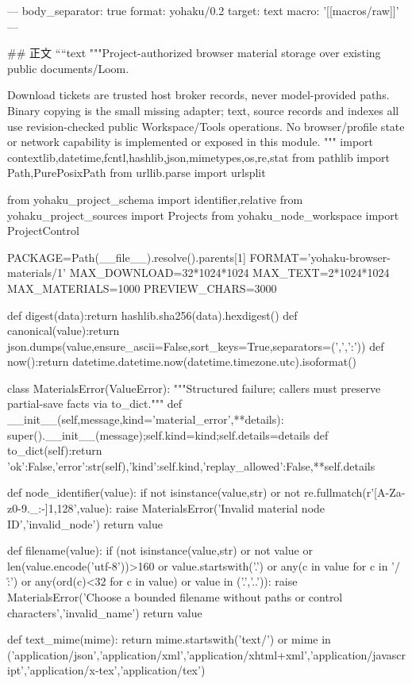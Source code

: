 ---
body_separator: true
format: yohaku/0.2
target: text
macro: '[[macros/raw]]'
---

## 正文
````text
"""Project-authorized browser material storage over existing public documents/Loom.

Download tickets are trusted host broker records, never model-provided paths.
Binary copying is the small missing adapter; text, source records and indexes all
use revision-checked public Workspace/Tools operations. No browser/profile state
or network capability is implemented or exposed in this module.
"""
import contextlib,datetime,fcntl,hashlib,json,mimetypes,os,re,stat
from pathlib import Path,PurePosixPath
from urllib.parse import urlsplit

from yohaku_project_schema import identifier,relative
from yohaku_project_sources import Projects
from yohaku_node_workspace import ProjectControl

PACKAGE=Path(__file__).resolve().parents[1]
FORMAT='yohaku-browser-materials/1'
MAX_DOWNLOAD=32*1024*1024
MAX_TEXT=2*1024*1024
MAX_MATERIALS=1000
PREVIEW_CHARS=3000

def digest(data):return hashlib.sha256(data).hexdigest()
def canonical(value):return json.dumps(value,ensure_ascii=False,sort_keys=True,separators=(',',':'))
def now():return datetime.datetime.now(datetime.timezone.utc).isoformat()

class MaterialsError(ValueError):
    """Structured failure; callers must preserve partial-save facts via to_dict."""
    def __init__(self,message,kind='material_error',**details):
        super().__init__(message);self.kind=kind;self.details=details
    def to_dict(self):return {'ok':False,'error':str(self),'kind':self.kind,'replay_allowed':False,**self.details}

def node_identifier(value):
    if not isinstance(value,str) or not re.fullmatch(r'[A-Za-z0-9._:-]{1,128}',value):
        raise MaterialsError('Invalid material node ID','invalid_node')
    return value

def filename(value):
    if (not isinstance(value,str) or not value or len(value.encode('utf-8'))>160
        or value.startswith('.') or any(c in value for c in '/\\:\0\r\n')
        or any(ord(c)<32 for c in value) or value in ('.','..')):
        raise MaterialsError('Choose a bounded filename without paths or control characters','invalid_name')
    return value

def text_mime(mime):
    return mime.startswith('text/') or mime in ('application/json','application/xml','application/xhtml+xml','application/javascript','application/x-tex','application/tex')

